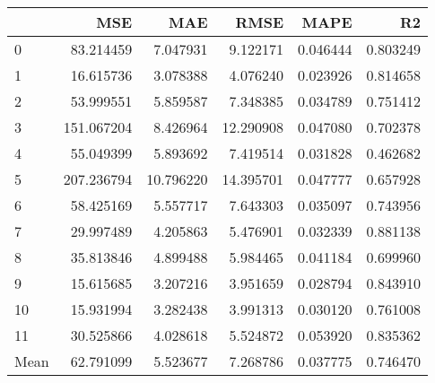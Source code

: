 \begin{tabular}{lrrrrr}
\toprule
 & MSE & MAE & RMSE & MAPE & R2 \\
\midrule
0 & 83.214459 & 7.047931 & 9.122171 & 0.046444 & 0.803249 \\
1 & 16.615736 & 3.078388 & 4.076240 & 0.023926 & 0.814658 \\
2 & 53.999551 & 5.859587 & 7.348385 & 0.034789 & 0.751412 \\
3 & 151.067204 & 8.426964 & 12.290908 & 0.047080 & 0.702378 \\
4 & 55.049399 & 5.893692 & 7.419514 & 0.031828 & 0.462682 \\
5 & 207.236794 & 10.796220 & 14.395701 & 0.047777 & 0.657928 \\
6 & 58.425169 & 5.557717 & 7.643303 & 0.035097 & 0.743956 \\
7 & 29.997489 & 4.205863 & 5.476901 & 0.032339 & 0.881138 \\
8 & 35.813846 & 4.899488 & 5.984465 & 0.041184 & 0.699960 \\
9 & 15.615685 & 3.207216 & 3.951659 & 0.028794 & 0.843910 \\
10 & 15.931994 & 3.282438 & 3.991313 & 0.030120 & 0.761008 \\
11 & 30.525866 & 4.028618 & 5.524872 & 0.053920 & 0.835362 \\
Mean & 62.791099 & 5.523677 & 7.268786 & 0.037775 & 0.746470 \\
\bottomrule
\end{tabular}
